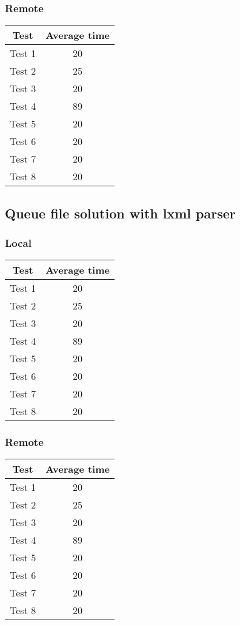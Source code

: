 \subsubsection{Remote}
\begin{center}
    \begin{tabular}{| c | c |}
    \hline
    Test & Average time \\ \hline
    Test 1 & 20 \\ \hline
    Test 2 & 25 \\ \hline
    Test 3 & 20 \\ \hline
    Test 4 & 89 \\ \hline
    Test 5 & 20 \\ \hline
    Test 6 & 20 \\ \hline
    Test 7 & 20 \\ \hline
    Test 8 & 20 \\ \hline
    \end{tabular}
\end{center}

\subsection{Queue file solution with lxml parser}
\subsubsection{Local}
\begin{center}
    \begin{tabular}{| c | c |}
    \hline
    Test & Average time \\ \hline
    Test 1 & 20 \\ \hline
    Test 2 & 25 \\ \hline
    Test 3 & 20 \\ \hline
    Test 4 & 89 \\ \hline
    Test 5 & 20 \\ \hline
    Test 6 & 20 \\ \hline
    Test 7 & 20 \\ \hline
    Test 8 & 20 \\ \hline
    \end{tabular}
\end{center}
\subsubsection{Remote}
\begin{center}
    \begin{tabular}{| c | c |}
    \hline
    Test & Average time \\ \hline
    Test 1 & 20 \\ \hline
    Test 2 & 25 \\ \hline
    Test 3 & 20 \\ \hline
    Test 4 & 89 \\ \hline
    Test 5 & 20 \\ \hline
    Test 6 & 20 \\ \hline
    Test 7 & 20 \\ \hline
    Test 8 & 20 \\ \hline
    \end{tabular}
\end{center}

